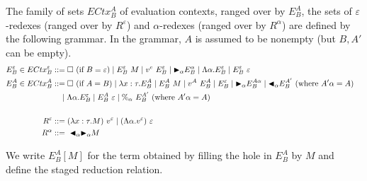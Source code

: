\begin{definition}
  The family of sets $ECtx^A_B$ of evaluation contexts, ranged over by $E^A_B$,
the sets of $\varepsilon$-redexes (ranged over by $R^\varepsilon$) and $\alpha$-redexes (ranged over by $R^\alpha$) are defined by the following grammar.
	In the grammar, $A$ is assumed to be nonempty (but $B,A'$ can be empty).
	\begin{align*}
		E^\varepsilon_B \in ECtx^\varepsilon_B & ::= \square\ (\text{if\ } B = \varepsilon) \mid E^\varepsilon_B\ M \mid v^e\ E^\varepsilon_B     
		\mid {\mathop{\blacktriangleright}}_\alpha E^\alpha_B \mid \Lambda\alpha.E^\varepsilon_B
		\mid E^\varepsilon_B\ \varepsilon                                                                                                 \\
		E^A_B \in ECtx^A_B               & ::= \square\ (\text{if } A = B) \mid \lambda x:\tau.E^A_B \mid E^A_B\ M \mid v^A\ E^A_B 
		\mid E^\varepsilon_B \mid {\mathop{\blacktriangleright}}_\alpha E^{A\alpha}_B
		\mid {\mathop{\blacktriangleleft}}_\alpha E^{A'}_B \ (\text{where } A'\alpha = A)                                                                    \\
		                                 & \quad \mid \Lambda\alpha.E^\varepsilon_B                                                   
		\mid E^A_B\ \varepsilon \mid \%_\alpha\ E^{A'}_B \ (\text{where } A'\alpha = A)                                                \\
\\
		 R^\varepsilon  & ::= (\lambda x:\tau.M)\ v^\varepsilon \mid (\Lambda\alpha.v^\varepsilon)\ \varepsilon                                       & \\
		 R^\alpha    & ::=\ {\mathop{\blacktriangleleft}}_\alpha {\mathop{\blacktriangleright}}_\alpha M                                                                                      & \\	\end{align*}
\end{definition}


We write $E^A_B[M]$ for the term obtained by filling the hole in $E^A_B$ by $M$
and define the staged reduction relation.

